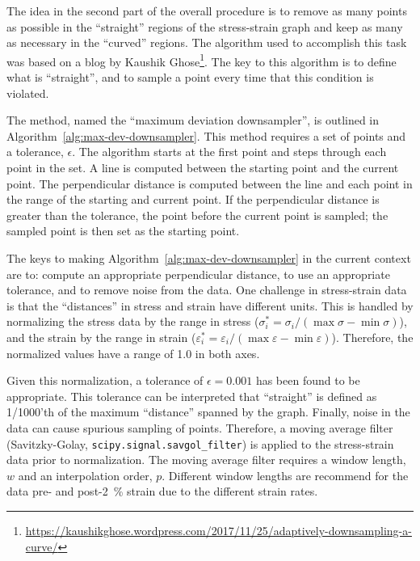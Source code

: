 \documentclass[a4paper,11pt]{article}
\begin{document}
The idea in the second part of the overall procedure is to remove as many points as possible in the ``straight'' regions of the stress-strain graph and keep as many as necessary in the ``curved'' regions.
The algorithm used to accomplish this task was based on a blog by Kaushik Ghose\footnote{\label{fn:blog}\url{https://kaushikghose.wordpress.com/2017/11/25/adaptively-downsampling-a-curve/}}.
The key to this algorithm is to define what is ``straight'', and to sample a point every time that this condition is violated.

The method, named the ``maximum deviation downsampler'', is outlined in Algorithm~\ref{alg:max-dev-downsampler}.
This method requires a set of points and a tolerance, $\epsilon$.
The algorithm starts at the first point and steps through each point in the set.
A line is computed between the starting point and the current point.
The perpendicular distance is computed between the line and each point in the range of the starting and current point.
If the perpendicular distance is greater than the tolerance, the point before the current point is sampled; the sampled point is then set as the starting point.

The keys to making Algorithm~\ref{alg:max-dev-downsampler} in the current context are to: compute an appropriate perpendicular distance, to use an appropriate tolerance, and to remove noise from the data.
One challenge in stress-strain data is that the ``distances'' in stress and strain have different units.
This is handled by normalizing the stress data by the range in stress ($\sigma_i^* = \sigma_i / (\max \sigma - \min \sigma)$), and the strain by the range in strain ($\varepsilon_i^* = \varepsilon_i / (\max \varepsilon - \min \varepsilon)$).
Therefore, the normalized values have a range of 1.0 in both axes.

Given this normalization, a tolerance of $\epsilon = 0.001$ has been found to be appropriate.
This tolerance can be interpreted that ``straight'' is defined as 1/1000'th of the maximum ``distance'' spanned by the graph.
Finally, noise in the data can cause spurious sampling of points.
Therefore, a moving average filter (Savitzky-Golay, \texttt{scipy.signal.savgol\_filter}) is applied to the stress-strain data prior to normalization.
The moving average filter requires a window length, $w$ and an interpolation order, $p$.
Different window lengths are recommend for the data pre- and post-2~\% strain due to the different strain rates.
\end{document}
